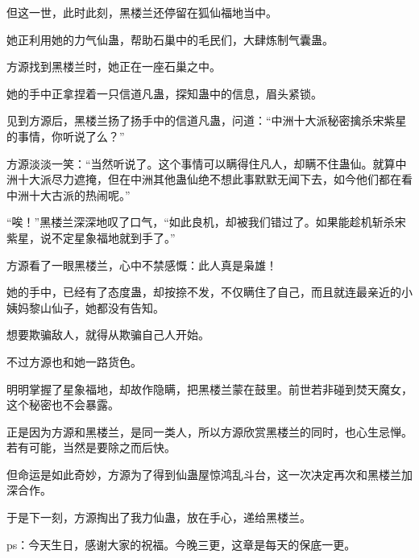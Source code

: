 \begin{this_body}
但这一世，此时此刻，黑楼兰还停留在狐仙福地当中。

她正利用她的力气仙蛊，帮助石巢中的毛民们，大肆炼制气囊蛊。

方源找到黑楼兰时，她正在一座石巢之中。

她的手中正拿捏着一只信道凡蛊，探知蛊中的信息，眉头紧锁。

见到方源后，黑楼兰扬了扬手中的信道凡蛊，问道：“中洲十大派秘密擒杀宋紫星的事情，你听说了么？”

方源淡淡一笑：“当然听说了。这个事情可以瞒得住凡人，却瞒不住蛊仙。就算中洲十大派尽力遮掩，但在中洲其他蛊仙绝不想此事默默无闻下去，如今他们都在看中洲十大古派的热闹呢。”

“唉！”黑楼兰深深地叹了口气，“如此良机，却被我们错过了。如果能趁机斩杀宋紫星，说不定星象福地就到手了。”

方源看了一眼黑楼兰，心中不禁感慨：此人真是枭雄！

她的手中，已经有了态度蛊，却按捺不发，不仅瞒住了自己，而且就连最亲近的小姨妈黎山仙子，她都没有告知。

想要欺骗敌人，就得从欺骗自己人开始。

不过方源也和她一路货色。

明明掌握了星象福地，却故作隐瞒，把黑楼兰蒙在鼓里。前世若非碰到焚天魔女，这个秘密也不会暴露。

正是因为方源和黑楼兰，是同一类人，所以方源欣赏黑楼兰的同时，也心生忌惮。若有可能，当然是要除之而后快。

但命运是如此奇妙，方源为了得到仙蛊屋惊鸿乱斗台，这一次决定再次和黑楼兰加深合作。

于是下一刻，方源掏出了我力仙蛊，放在手心，递给黑楼兰。

ps：今天生日，感谢大家的祝福。今晚三更，这章是每天的保底一更。

\end{this_body}

